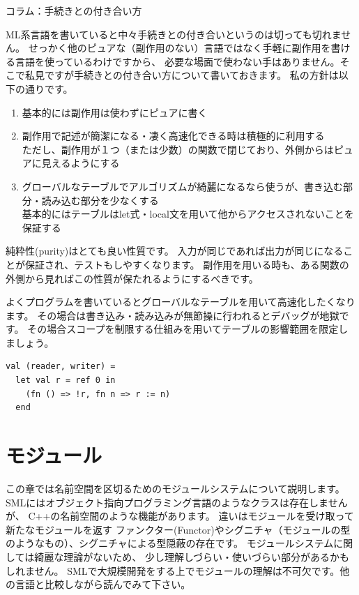 \documentclass[11pt,a4paper]{article}
\begin{document}
\begin{itembox}[l]{コラム：手続きとの付き合い方}

ML系言語を書いていると中々手続きとの付き合いというのは切っても切れません。
せっかく他のピュアな（副作用のない）言語ではなく手軽に副作用を書ける言語を使っているわけですから、
必要な場面で使わない手はありません。そこで私見ですが手続きとの付き合い方について書いておきます。
私の方針は以下の通りです。

\begin{enumerate}
\item 基本的には副作用は使わずにピュアに書く
\item 副作用で記述が簡潔になる・凄く高速化できる時は積極的に利用する\\
  ただし、副作用が１つ（または少数）の関数で閉じており、外側からはピュアに見えるようにする
\item グローバルなテーブルでアルゴリズムが綺麗になるなら使うが、書き込む部分・読み込む部分を少なくする\\
  基本的にはテーブルはlet式・local文を用いて他からアクセスされないことを保証する
\end{enumerate}

純粋性(purity)はとても良い性質です。
入力が同じであれば出力が同じになることが保証され、テストもしやすくなります。
副作用を用いる時も、ある関数の外側から見ればこの性質が保たれるようにするべきです。

よくプログラムを書いているとグローバルなテーブルを用いて高速化したくなります。
その場合は書き込み・読み込みが無節操に行われるとデバッグが地獄です。
その場合スコープを制限する仕組みを用いてテーブルの影響範囲を限定しましょう。

\begin{lstlisting}[caption=let式でリファレンスが他からアクセスされないことを保証する]
val (reader, writer) =
  let val r = ref 0 in
    (fn () => !r, fn n => r := n)
  end
\end{lstlisting}

\end{itembox}

\section{モジュール}

この章では名前空間を区切るためのモジュールシステムについて説明します。
SMLにはオブジェクト指向プログラミング言語のようなクラスは存在しませんが、
C++の名前空間のような機能があります。
違いはモジュールを受け取って新たなモジュールを返す
ファンクター(Functor)やシグニチャ（モジュールの型のようなもの）、シグニチャによる型隠蔽の存在です。
モジュールシステムに関しては綺麗な理論がないため、
少し理解しづらい・使いづらい部分があるかもしれません。
SMLで大規模開発をする上でモジュールの理解は不可欠です。他の言語と比較しながら読んでみて下さい。
\end{document}
